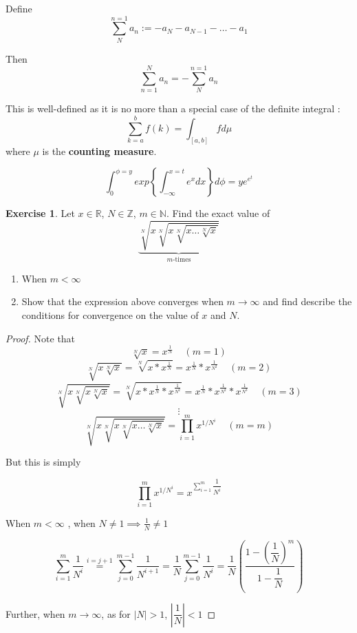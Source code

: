 \documentclass[12pt a]{article}
\theoremstyle{definition}
\theoremstyle{definition}
\newtheorem{exercise}{Exercise}
\theoremstyle{definition}
\begin{document}
{\noindent
Define 
$$
\sum_{N}^{n=1} a_n  := -a_N - a_{N-1} - \dots - a_1
$$

\noindent
Then 
$$
\sum_{n=1}^{N} a_n = - \sum_{N}^{n=1} a_n
$$

\noindent
This is well-defined as it is no more than a special case of the definite integral : 
$$
\sum_{k=a}^{b} f(k) = \int_{[a,b]} f d\mu
$$
where $\mu$ is the \textbf{counting measure}. 



$$
\int_{0}^{\phi=y} exp\left\{\displaystyle \int_{-\infty}^{x=t} e^{x} dx \right\} d\phi = ye^{ \displaystyle e^{\displaystyle t}}
$$

\newpage

\begin{exercise}
Let $x\in \mathbb{R}$, $N \in \mathbb{Z}$, $m \in \mathbb{N}$. Find the exact value of
$$
\underset{m\text{-times}}{\underbrace{\displaystyle \sqrt[N]{x \sqrt[N]{x \sqrt[N]{x \dots \sqrt[N]{x}} }}
}}
$$
\begin{enumerate}
	\item When $m < \infty$ 
	\item Show that the expression above converges when $m \rightarrow \infty$ and find describe the conditions for convergence on the value of $x$ and $N$. 
\end{enumerate}
\end{exercise}

\begin{proof}
Note that
$$\sqrt[N]{x} = x^{\frac{1}{N}} \;\;\;\; (m=1)$$
$$\sqrt[N]{x \sqrt[N]{x} } = \sqrt[N]{x * x^{\frac{1}{N}} } = x^{\frac{1}{N}} * x^{\frac{1}{N^{2}}} \;\;\;\; (m=2)$$
$$\sqrt[N]{x \sqrt[N]{x \sqrt[N]{x}} } = \sqrt[N]{x * x^{\frac{1}{N}} * x^{\frac{1}{N^{2}}} } = x^{\frac{1}{N}} * x^{\frac{1}{N^{2}}} * x^{\frac{1}{N^3}} \;\;\;\; (m=3)$$
$$\vdots$$
$$\sqrt[N]{x \sqrt[N]{x \sqrt[N]{x \dots \sqrt[N]{x}}}}
= \prod_{i=1}^{m}x^{1/N^{i}} \;\;\;\; (m=m)$$

But this is simply 

$$
\prod_{i=1}^{m}x^{1/N^{i}} 
= 
x^{\displaystyle \sum_{i=1}^{m} \dfrac{1}{N^{i}} }
$$

When $m < \infty$ , when $N \neq 1 \implies \frac{1}{N} \neq 1$

$$
\sum_{i=1}^{m} \dfrac{1}{N^{i}}
\overset{i=j+1}{=} 
\sum_{j=0}^{m-1} \dfrac{1}{N^{i+1}}
= 
\frac{1}{N}\sum_{j=0}^{m-1} \dfrac{1}{N^{i}}
= 
\frac{1}{N}\left( \dfrac{1-\left(\dfrac{1}{N}\right)^{m}}{1 - \dfrac{1}{N}} \right)
$$

Further, when $m \rightarrow \infty$, as for $|N|>1$,  $\left|\dfrac{1}{N}\right| < 1$



\end{proof}}
\end{document}
